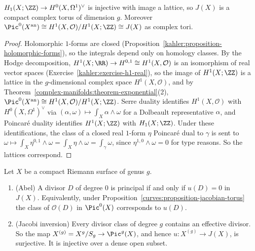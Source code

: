 \begin{proposition}\label{curves:proposition-jacobian-torus}
$H_1(X; \ZZ) \to H^0(X, \Omega^1)^\vee$ is injective with image a lattice, so $J(X)$ is a compact complex torus of dimension $g$. Moreover
$\Pic^0(X^{\mathrm{an}}) \cong H^1(X, \mathcal{O})/H^1(X; \ZZ) \cong J(X)$ as complex tori.
\end{proposition}

\begin{proof}
Holomorphic $1$-forms are closed (Proposition~\ref{kahler:proposition-holomorphic-forms}), so the integrals depend only on homology classes. By the Hodge
decomposition, $H^1(X; \RR) \to H^{0,1} \cong H^1(X, \mathcal{O})$ is an isomorphism of real vector spaces (Exercise~\ref{kahler:exercise-h1-real}), so the image of
$H^1(X; \ZZ)$ is a lattice in the $g$-dimensional complex space $H^1(X, \mathcal{O})$, and by Theorem~\ref{complex-manifolds:theorem-exponential}(2),
$\Pic^0(X^{\mathrm{an}}) \cong H^1(X, \mathcal{O})/H^1(X; \ZZ)$. Serre duality identifies $H^1(X, \mathcal{O})$ with $H^0(X, \Omega^1)^\vee$ via $(\alpha, \omega) \mapsto \int_X\alpha \wedge \omega$ for a
Dolbeault representative $\alpha$, and Poincar\'e duality identifies $H^1(X; \ZZ)$ with $H_1(X; \ZZ)$. Under these identifications, the class of a closed real $1$-form
$\eta$ Poincar\'e dual to $\gamma$ is sent to $\omega \mapsto \int_X\eta^{0,1} \wedge \omega = \int_X\eta \wedge \omega = \int_\gamma\omega$, since $\eta^{1,0} \wedge \omega = 0$ for type
reasons. So the lattices correspond.
\end{proof}

\begin{theorem}\label{curves:theorem-abel-jacobi}
Let $X$ be a compact Riemann surface of genus $g$.
\begin{enumerate}
\item (Abel) A divisor $D$ of degree $0$ is principal if and only if $u(D) = 0$ in $J(X)$. Equivalently, under Proposition~\ref{curves:proposition-jacobian-torus} the class of
$\mathcal{O}(D)$ in $\Pic^0(X)$ corresponds to $u(D)$.
\item (Jacobi inversion) Every divisor class of degree $g$ contains an effective divisor. So the map $X^{(g)} = X^g/S_g \to \Pic^g(X)$, and hence
$u \colon X^{(g)} \to J(X)$, is surjective. It is injective over a dense open subset.
\end{enumerate}
\end{theorem}

